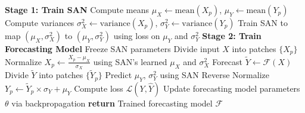\documentclass[sigconf,anonymous,review]{acmart}
\begin{document}
\begin{algorithm}[h]
  \caption{Sequential Adaptive Normalization (SAN)}
  \label{alg:san}
     \textbf{Stage 1: Train SAN}\;
    {
         Compute means $\mu_X \gets \text{mean}(X_p)$, $\mu_Y \gets \text{mean}(Y_p)$ \;
         Compute variances $\sigma_X^2 \gets \text{variance}(X_p)$, $\sigma_Y^2 \gets \text{variance}(Y_p)$ \;
         Train SAN to map $(\mu_X, \sigma_X^2)$ to $(\mu_Y, \sigma_Y^2)$ using loss on $\mu_Y$ and $\sigma_Y^2$ \;
     \textbf{Stage 2: Train Forecasting Model}
     Freeze SAN parameters\;
         {Divide input $X$ into patches $\{X_p\}$ \;
        {
             Normalize $X_p \gets \frac{X_p - \mu_X}{\sigma_X}$ using SAN's learned $\mu_X$ and $\sigma_X^2$
        }
         Forecast $\tilde{Y} \gets \mathcal{F}(X)$ \;
         Divide $\tilde{Y}$ into patches $\{\tilde{Y}_p\}$ \;
             {Predict $\mu_Y$, $\sigma_Y^2$ using SAN
             Reverse Normalize $Y_p \gets \tilde{Y}_p \times \sigma_Y + \mu_Y$
             }
        }
         Compute loss $\mathcal{L}(Y, \hat{Y})$ \;
         Update forecasting model parameters $\theta$ via backpropagation \;
         }
     \textbf{return} Trained forecasting model  $\mathcal{F}$ \;
\end{algorithm}
\end{document}
